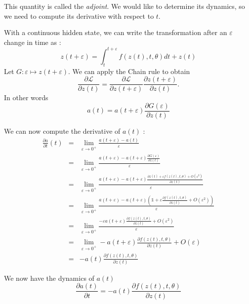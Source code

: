 \documentclass[10pt,a4paper]{article}
\theoremstyle{definition}
\theoremstyle{plain}
\begin{document}
This quantity is called the \textit{adjoint}. We would like to determine its dynamics, so we need to compute its derivative with respect to $t$.

With a continuous hidden state, we can write the transformation after an $\varepsilon$ change in time as :
\begin{equation}
\label{zteps}
z(t+\varepsilon) = \int^{t+\varepsilon}_{t} f(z(t),t,\theta) dt + z(t)
\end{equation}
Let $ G : \varepsilon \mapsto z(t+\varepsilon)$. We can apply the Chain rule to obtain
\begin{equation*}
\frac{\partial \mathcal{L}}{\partial z(t)} = \frac{\partial \mathcal{L}}{\partial z(t+\varepsilon)} \frac{\partial z(t+\varepsilon)}{\partial z(t)}.
\end{equation*}
In other words 
\begin{equation}
\label{at}
a(t) = a(t+\varepsilon)\frac{\partial G(\varepsilon)}{\partial z(t)}
\end{equation}


We can now compute the derivative of $a(t)$ :
\begin{eqnarray*}
\frac{\partial a}{\partial t}(t) &=& \lim_{\varepsilon \rightarrow 0^+} \frac{a(t+\varepsilon) - a(t)}{\varepsilon}\\
&=& \lim_{\varepsilon \rightarrow 0^+} \frac{a(t+\varepsilon) - a(t+\varepsilon)\frac{\partial G(\varepsilon)}{\partial z(t)}}{\varepsilon}\\
&=& \lim_{\varepsilon \rightarrow 0^+} \frac{a(t+\varepsilon) - a(t+\varepsilon)\frac{\partial z(t) + \varepsilon f(z(t),t,\theta) + O(\varepsilon^2)}{\partial z(t)}}{\varepsilon} \\
&=& \lim_{\varepsilon \rightarrow 0^+} \frac{a(t+\varepsilon) - a(t+\varepsilon)(\mathds{1} + \varepsilon \frac{\partial f(z(t),t,\theta)} {\partial z(t)}+ O(\varepsilon^2))}{\varepsilon}\\
&=& \lim_{\varepsilon \rightarrow 0^+} \frac{-\varepsilon a(t+\varepsilon) \frac{\partial f(z(t),t,\theta)} {\partial z(t)}+ O(\varepsilon^2)}{\varepsilon}\\
&=& \lim_{\varepsilon \rightarrow 0^+} - a(t+\varepsilon) \frac{\partial f(z(t),t,\theta)} {\partial z(t)}+ O(\varepsilon)\\
&=& -a(t)\frac{\partial f(z(t),t,\theta)} {\partial z(t)}
\end{eqnarray*}

We now have the dynamics of $a(t)$
\begin{equation}
\label{dynat}
\frac{\partial a(t)}{\partial t} = -a(t)\frac{\partial f(z(t),t,\theta)} {\partial z(t)}
\end{equation}
 
\end{document}
